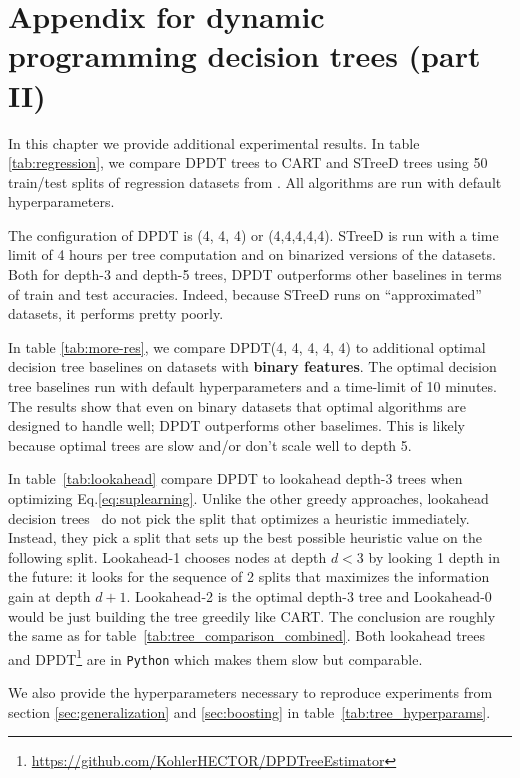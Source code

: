 \chapter{Appendix for dynamic programming decision trees (part II)}
\label{chap-app-dpdt}
In this chapter we provide additional experimental results. In table \ref{tab:regression}, we compare DPDT trees to CART and STreeD trees using 50 train/test splits of regression datasets from \cite{grinsztajn2022tree}. All algorithms are run with default hyperparameters. 

The configuration of DPDT is (4, 4, 4) or (4,4,4,4,4). STreeD is run with a time limit of 4 hours per tree computation and on binarized versions of the datasets. 
Both for depth-3 and depth-5 trees, DPDT outperforms other baselines in terms of train and test accuracies. Indeed, because STreeD runs on ``approximated'' datasets, it performs pretty poorly. 

In table \ref{tab:more-res}, we compare DPDT(4, 4, 4, 4, 4) to additional optimal decision tree baselines on datasets with \textbf{binary features}. The optimal decision tree baselines run with default hyperparameters and a time-limit of 10 minutes. The results show that even on binary datasets that optimal algorithms are designed to handle well; DPDT outperforms other baselimes. This is likely because optimal trees are slow and/or don't scale well to depth 5.

In table~\ref{tab:lookahead} compare DPDT to lookahead depth-3 trees when optimizing Eq.\ref{eq:suplearning}. Unlike the other greedy approaches, lookahead decision trees~\cite{lookahead} do not pick the split that optimizes a heuristic immediately. Instead, they pick a split that sets up the best possible heuristic value on the following split. Lookahead-1 chooses nodes at depth $d<3$ by looking 1 depth in the future: it looks for the sequence of 2 splits that maximizes the information gain at depth $d + 1$. Lookahead-2 is the optimal depth-3 tree and Lookahead-0 would be just building the tree greedily like CART. The conclusion are roughly the same as for table~\ref{tab:tree_comparison_combined}. Both lookahead trees and DPDT\footnote{\url{https://github.com/KohlerHECTOR/DPDTreeEstimator}} are in \texttt{Python} which makes them slow but comparable.

We also provide the hyperparameters necessary to reproduce experiments from section \ref{sec:generalization} and \ref{sec:boosting} in table~\ref{tab:tree_hyperparams}.


